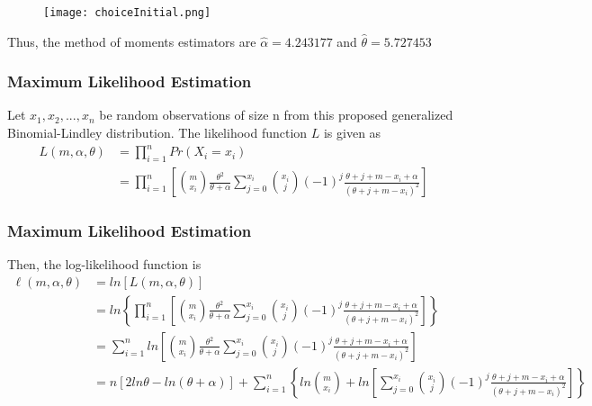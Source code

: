 \documentclass{beamer}
\begin{document}
\begin{frame}
\begin{figure}
\texttt{[image: choiceInitial.png]}
\end{figure}

Thus, the method of moments estimators are $\hat{\alpha}=4.243177$ and $\hat{\theta}=5.727453$
\end{frame}

\begin{frame}
\frametitle{Maximum Likelihood Estimation}
Let $x_{1}, x_{2}, ..., x_{n}$ be random observations of size n from this proposed generalized Binomial-Lindley distribution. The likelihood function $L$ is given as
\[
\begin{split}
L(m,\alpha,\theta)&= \prod\limits_{i=1}^n Pr(X_{i}=x_{i})\\
&= \prod\limits_{i=1}^n \left[ {m \choose x_{i}} \frac{\theta^2}{\theta+\alpha} \sum_{j=0}^{x_{i}} {x_{i} \choose j} (-1)^{j} \frac{\theta+j+m-x_{i}+\alpha}{(\theta+j+m-x_{i})^2}\right]
\end{split}
\]
\end{frame}

\begin{frame}
\frametitle{Maximum Likelihood Estimation}
Then, the log-likelihood function is 
\medskip
\footnotesize
\[
\begin{split}
\ell(m,\alpha,\theta)&= ln \left[ L(m,\alpha,\theta)\right] \\
&= ln \left\lbrace \prod\limits_{i=1}^n \left[ {m \choose x_{i}} \frac{\theta^2}{\theta+\alpha} \sum_{j=0}^{x_{i}} {x_{i} \choose j} (-1)^{j} \frac{\theta+j+m-x_{i}+\alpha}{(\theta+j+m-x_{i})^2}\right] \right\rbrace\\
&= \sum\limits_{i=1}^n ln \left[ {m \choose x_{i}} \frac{\theta^2}{\theta+\alpha} \sum_{j=0}^{x_{i}} {x_{i} \choose j} (-1)^{j} \frac{\theta+j+m-x_{i}+\alpha}{(\theta+j+m-x_{i})^2}\right]\\
&= n\left[  2ln\theta - ln(\theta+\alpha)\right]   +\sum\limits_{i=1}^n \left\lbrace ln {m \choose x_{i}} + ln \left[ \sum_{j=0}^{x_{i}} {x_{i} \choose j} (-1)^{j} \frac{\theta+j+m-x_{i}+\alpha}{(\theta+j+m-x_{i})^2} \right]  \right\rbrace 
\end{split}
\]
\end{frame}
\end{document}
